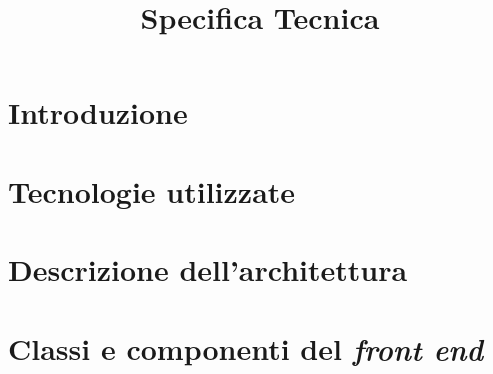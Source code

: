 


\author{\ALL}
\supervisor{\MM}
\dest{\ALL}
\title{Specifica Tecnica}

\newcommand{\nogloxy}[1]{#1}
\newcommand{\subsubsubsection}[1]{\paragraph{#1}}
\newcommand{\textt}[1]{\texttt{#1}}



\maketitle

\tableofcontents



\section{Introduzione}


\section{Tecnologie utilizzate}


\section{Descrizione dell'architettura}


\section{Classi e componenti del \emph{front end}}


